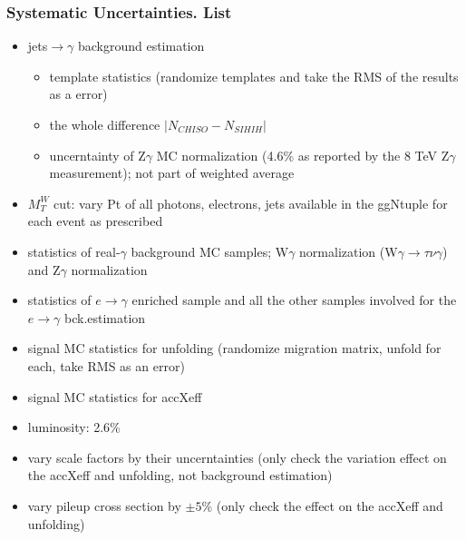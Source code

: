 \begin{frame}\frametitle{Systematic Uncertainties. List}
  \begin{itemize}
    \scriptsize
    \item jets$\rightarrow\gamma$ background estimation 
       \begin{itemize}
          \scriptsize
          \item template statistics (randomize templates and take the RMS of the results as a error)
          \item the whole difference  $|N_{CHISO}-N_{SIHIH}|$
          \item uncerntainty of Z$\gamma$ MC normalization (4.6\% as reported by the 8 TeV Z$\gamma$ measurement); not part of weighted average
       \end{itemize}
    \item $M_T^W$ cut: vary Pt of all photons, electrons, jets available in the ggNtuple for each event as prescribed
    \item statistics of real-$\gamma$ background MC samples; W$\gamma$ normalization (W$\gamma\rightarrow\tau\nu\gamma$) and Z$\gamma$ normalization
    \item statistics of $e\rightarrow\gamma$ enriched sample and all the other samples involved for the $e\rightarrow\gamma$ bck.estimation
    \item signal MC statistics for unfolding (randomize migration matrix, unfold for each, take RMS as an error)
    \item signal MC statistics for accXeff
    \item luminosity: 2.6\%
    \item vary scale factors by their uncerntainties (only check the variation effect on the accXeff and unfolding, not background estimation)
    \item vary pileup cross section by $\pm 5$\% (only check the effect on the accXeff and unfolding)
  \end{itemize}
\end{frame}

